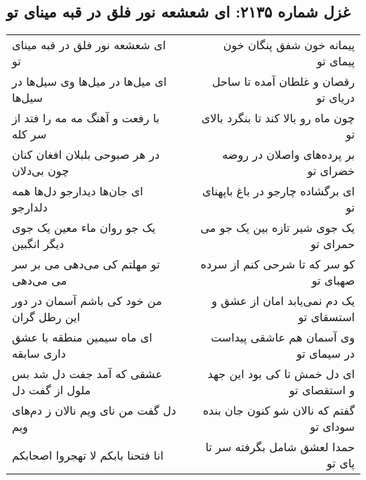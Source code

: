 \begin{center}
\section*{غزل شماره ۲۱۳۵: ای شعشعه نور فلق در قبه مینای تو}
\label{sec:2135}
\begin{longtable}{l p{0.5cm} r}
ای شعشعه نور فلق در قبه مینای تو
&&
پیمانه خون شفق پنگان خون پیمای تو
\\
ای میل‌ها در میل‌ها وی سیل‌ها در سیل‌ها
&&
رقصان و غلطان آمده تا ساحل دریای تو
\\
با رفعت و آهنگ مه مه را فتد از سر کله
&&
چون ماه رو بالا کند تا بنگرد بالای تو
\\
در هر صبوحی بلبلان افغان کنان چون بی‌دلان
&&
بر پرده‌های واصلان در روضه خضرای تو
\\
ای جان‌ها دیدارجو دل‌ها همه دلدارجو
&&
ای برگشاده چارجو در باغ باپهنای تو
\\
یک جو روان ماء معین یک جوی دیگر انگبین
&&
یک جوی شیر تازه بین یک جو می حمرای تو
\\
تو مهلتم کی می‌دهی می بر سر می می‌دهی
&&
کو سر که تا شرحی کنم از سرده صهبای تو
\\
من خود کی باشم آسمان در دور این رطل گران
&&
یک دم نمی‌یابد امان از عشق و استسقای تو
\\
ای ماه سیمین منطقه با عشق داری سابقه
&&
وی آسمان هم عاشقی پیداست در سیمای تو
\\
عشقی که آمد جفت دل شد بس ملول از گفت دل
&&
ای دل خمش تا کی بود این جهد و استقصای تو
\\
دل گفت من نای ویم نالان ز دم‌های ویم
&&
گفتم که نالان شو کنون جان بنده سودای تو
\\
انا فتحنا بابکم لا تهجروا اصحابکم
&&
حمدا لعشق شامل بگرفته سر تا پای تو
\\
\end{longtable}
\end{center}
